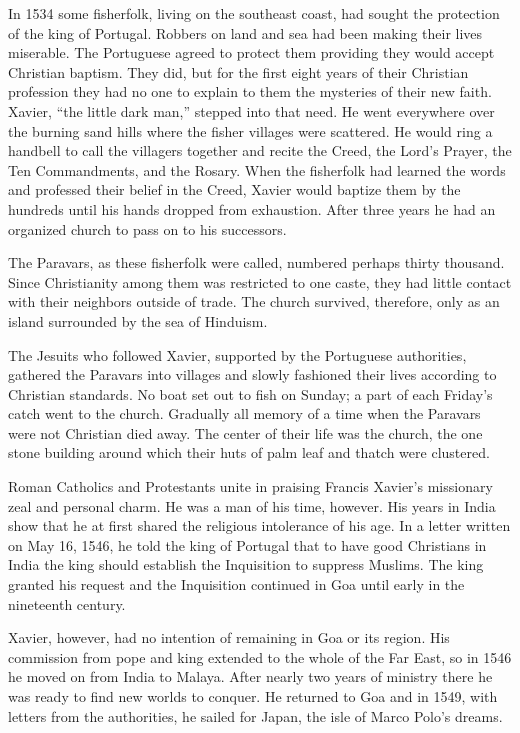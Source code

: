 In 1534 some fisherfolk, living on the southeast coast, had sought the protection of the king of
Portugal. Robbers on land and sea had been making their lives miserable. The Portuguese agreed to
protect them providing they would accept Christian baptism. They did, but for the first eight years
of their Christian profession they had no one to explain to them the mysteries of their new faith.
Xavier, “the little dark man,” stepped into that need. He went everywhere over the burning sand
hills where the fisher villages were scattered. He would ring a handbell to call the villagers
together and recite the Creed, the Lord’s Prayer, the Ten Commandments, and the Rosary. When the
fisherfolk had learned the words and professed their belief in the Creed, Xavier would baptize them
by the hundreds until his hands dropped from exhaustion. After three years he had an organized
church to pass on to his successors.

The Paravars, as these fisherfolk were called, numbered perhaps thirty thousand. Since Christianity
among them was restricted to one caste, they had little contact with their neighbors outside of
trade. The church survived, therefore, only as an island surrounded by the sea of Hinduism.

The Jesuits who followed Xavier, supported by the Portuguese authorities, gathered the Paravars into
villages and slowly fashioned their lives according to Christian standards. No boat set out to fish
on Sunday; a part of each Friday’s catch went to the church. Gradually all memory of a time when the
Paravars were not Christian died away. The center of their life was the church, the one stone
building around which their huts of palm leaf and thatch were clustered.

Roman Catholics and Protestants unite in praising Francis Xavier’s missionary zeal and personal
charm. He was a man of his time, however. His years in India show that he at first shared the
religious intolerance of his age. In a letter written on May 16, 1546, he told the king of Portugal
that to have good Christians in India the king should establish the Inquisition to suppress Muslims.
The king granted his request and the Inquisition continued in Goa until early in the nineteenth
century.

Xavier, however, had no intention of remaining in Goa or its region. His commission from pope and
king extended to the whole of the Far East, so in 1546 he moved on from India to Malaya. After
nearly two years of ministry there he was ready to find new worlds to conquer. He returned to Goa
and in 1549, with letters from the authorities, he sailed for Japan, the isle of Marco Polo’s
dreams.

